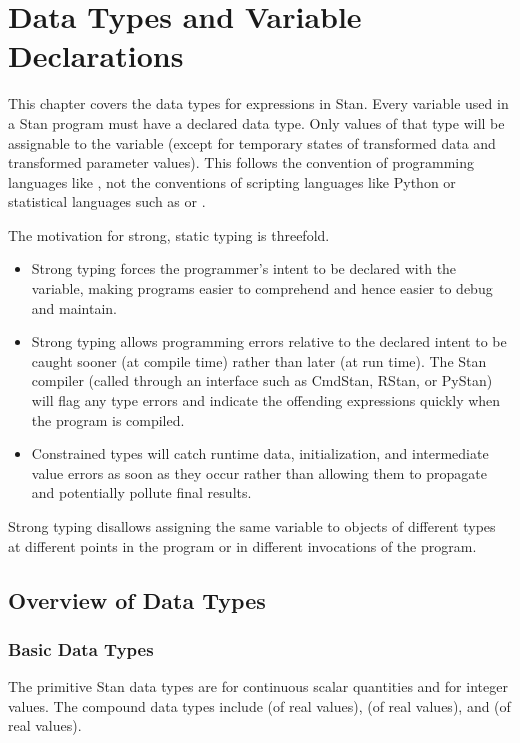 \chapter{Data Types and Variable Declarations}\label{data-types.chapter}

\noindent
This chapter covers the data types for expressions in Stan.  Every
variable used in a Stan program must have a declared data type.  Only
values of that type will be assignable to the variable (except for
temporary states of transformed data and transformed parameter
values).  This follows the convention of programming languages like
\Cpp, not the conventions of scripting languages like Python or
statistical languages such as \R or \BUGS.

The motivation for strong, static typing is threefold.
%
\begin{itemize}
\item Strong typing forces the programmer's intent to be declared with
  the variable, making programs easier to comprehend and hence easier
  to debug and maintain.
\item Strong typing allows programming errors relative to the declared
  intent to be caught sooner (at compile time) rather than later (at
  run time).  The Stan compiler (called through an interface such as
  CmdStan, RStan, or PyStan) will flag any type errors and indicate
  the offending expressions quickly when the program is compiled.
\item Constrained types will catch runtime data, initialization, and
  intermediate value errors as soon as they occur rather than allowing
  them to propagate and potentially pollute final results.
\end{itemize}
%
Strong typing disallows assigning the same variable to objects of
different types at different points in the program or in different
invocations of the program.

\section{Overview of Data Types}

\subsection{Basic Data Types}

The primitive Stan data types are  for continuous scalar
quantities and  for integer values.  The compound data
types include  (of real values),  (of
real values), and  (of real values).

